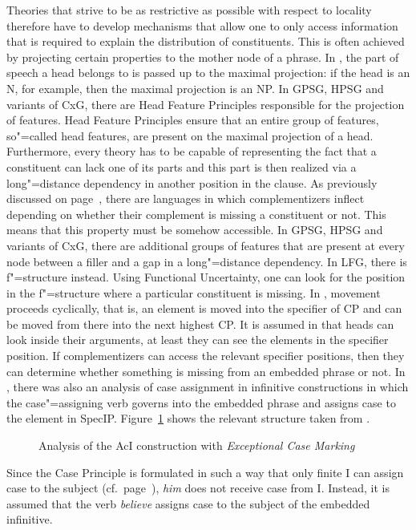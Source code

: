 Theories that strive to be as restrictive as possible with respect to locality therefore have to develop mechanisms that allow one to only
access information that is required to explain the distribution of constituents.
This is often achieved by projecting certain properties to the mother node of a phrase. In \xbart, the part of speech a head belongs to is
passed up to the maximal projection: if the head is an N, for example, then the maximal projection is an NP. In GPSG, HPSG and variants
of CxG, there are Head Feature Principles responsible for the projection of features. Head Feature Principles ensure that an entire group of
features, so"=called head features, are present on the maximal projection of a head.
Furthermore, every theory has to be capable of representing the fact that a constituent can lack one of its parts and this part is then realized via a long"=distance
dependency in another position in the clause.
As previously discussed on page~\pageref{page-Irish-complementizers}, there are languages in which complementizers inflect depending on whether their
complement is missing a constituent or not. This means that this property must be somehow accessible. In GPSG, HPSG and variants of CxG, there are additional
groups of features that are present at every node between a filler and a gap in a long"=distance dependency.
In LFG, there is f"=structure instead. Using Functional Uncertainty, one can look for the position in the f"=structure where a particular
constituent is missing. In \gbt, movement proceeds cyclically, that is, an element is moved into the specifier of CP and can
be moved from there into the next highest CP. It is assumed in \gbt that heads can look inside their arguments, at least they can see the elements in the
specifier position. If complementizers can access the relevant specifier positions, then they can
determine whether something is missing from an embedded phrase or not. In \gbt, there was also an analysis of case
assignment in infinitive constructions in which the case"=assigning verb governs into the embedded
phrase and assigns case to the element in \mbox{SpecIP}. Figure~\ref{Abbildung-ECM} shows the
relevant structure taken from .
\begin{figure}[t]
\centering
{}
\caption{\label{Abbildung-ECM}Analysis of the AcI construction with \emph{Exceptional Case Marking}}
\end{figure}%
Since the Case Principle is formulated in such a way that only finite I can assign case to the subject
(cf.\ page~\pageref{Kasusprinzip-GB}), \emph{him} does not receive case from I. Instead, it is assumed that
the verb \emph{believe} assigns case to the subject of the embedded infinitive.

